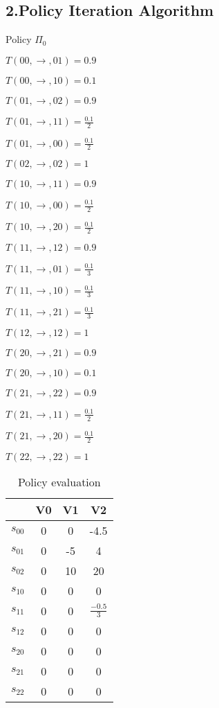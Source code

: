 \documentclass[12pt]{amsart}
\begin{document}
\clearpage

\subsection*{2.Policy Iteration Algorithm}

Policy $\Pi_{0}$

$T(00,\rightarrow,01)=0.9$

$T(00,\rightarrow,10)=0.1$

$T(01,\rightarrow,02)=0.9$

$T(01,\rightarrow,11)=\frac{0.1}{2}$

$T(01,\rightarrow,00)=\frac{0.1}{2}$

$T(02,\rightarrow,02)=1$

$T(10,\rightarrow,11)=0.9$

$T(10,\rightarrow,00)=\frac{0.1}{2}$

$T(10,\rightarrow,20)=\frac{0.1}{2}$

$T(11,\rightarrow,12)=0.9$

$T(11,\rightarrow,01)=\frac{0.1}{3}$

$T(11,\rightarrow,10)=\frac{0.1}{3}$

$T(11,\rightarrow,21)=\frac{0.1}{3}$

$T(12,\rightarrow,12)=1$

$T(20,\rightarrow,21)=0.9$

$T(20,\rightarrow,10)=0.1$

$T(21,\rightarrow,22)=0.9$

$T(21,\rightarrow,11)=\frac{0.1}{2}$

$T(21,\rightarrow,20)=\frac{0.1}{2}$

$T(22,\rightarrow,22)=1$

\begin{table}[!hbp]
\begin{tabular}{|c|c|c|c|}
\hline
\hline
 & V0 & V1 & V2  \\
\hline
$s_{00}$ & 0 & 0 & -4.5  \\
\hline
$s_{01}$ & 0 & -5 & 4  \\
\hline
$s_{02}$ & 0 & 10 & 20  \\
\hline
$s_{10}$ & 0 & 0 & 0 \\
\hline
$s_{11}$ & 0 & 0 & $\frac{-0.5}{3}$ \\
\hline
$s_{12}$ & 0 & 0 & 0  \\
\hline
$s_{20}$ & 0 & 0 & 0  \\
\hline
$s_{21}$ & 0 & 0 & 0  \\
\hline
$s_{22}$ & 0 & 0 & 0 \\
\hline
\end{tabular}
\caption{Policy evaluation}
\end{table} 
\end{document}
